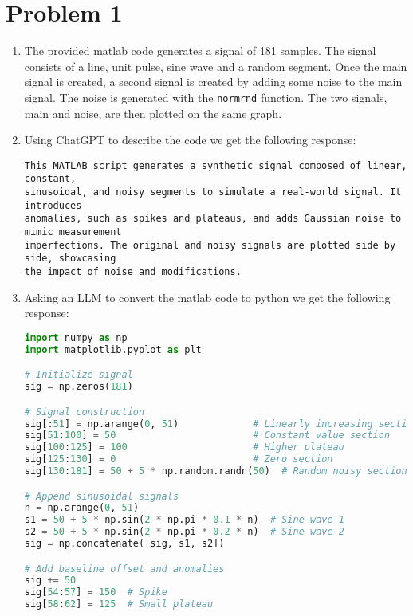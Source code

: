 \documentclass{article}
\begin{document}
\section{Problem 1}
\begin{enumerate}[label=\alph*.]
    \item The provided matlab code generates a signal of 181 samples. The signal consists of a line, unit pulse, sine wave and a random segment. Once the main signal is created, a second signal is created by adding some noise to the main signal. The noise is generated with the \texttt{normrnd} function. The two signals, main and noise, are then plotted on the same graph.

    \item Using ChatGPT to describe the code we get the following response:
    \begin{verbatim}
This MATLAB script generates a synthetic signal composed of linear, constant, 
sinusoidal, and noisy segments to simulate a real-world signal. It introduces 
anomalies, such as spikes and plateaus, and adds Gaussian noise to mimic measurement 
imperfections. The original and noisy signals are plotted side by side, showcasing 
the impact of noise and modifications.
    \end{verbatim}

    \item Asking an LLM to convert the matlab code to python we get the following response:

    \begin{lstlisting}[language=Python, label={code:p1}, caption={Python code generated by LLM}]
import numpy as np
import matplotlib.pyplot as plt

# Initialize signal
sig = np.zeros(181)

# Signal construction
sig[:51] = np.arange(0, 51)             # Linearly increasing section
sig[51:100] = 50                        # Constant value section
sig[100:125] = 100                      # Higher plateau
sig[125:130] = 0                        # Zero section
sig[130:181] = 50 + 5 * np.random.randn(50)  # Random noisy section

# Append sinusoidal signals
n = np.arange(0, 51)
s1 = 50 + 5 * np.sin(2 * np.pi * 0.1 * n)  # Sine wave 1
s2 = 50 + 5 * np.sin(2 * np.pi * 0.2 * n)  # Sine wave 2
sig = np.concatenate([sig, s1, s2])

# Add baseline offset and anomalies
sig += 50
sig[54:57] = 150  # Spike
sig[58:62] = 125  # Small plateau


\end{lstlisting}
\end{enumerate}
\end{document}
